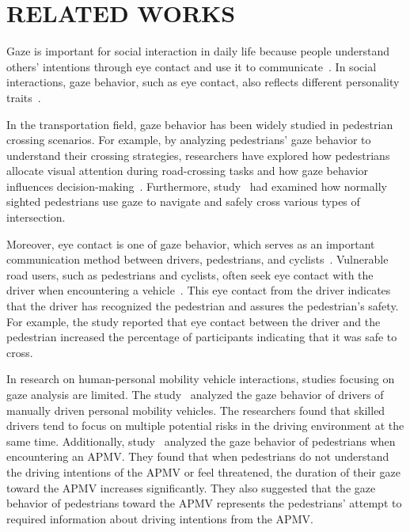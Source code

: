 \section{RELATED WORKS}
Gaze is important for social interaction in daily life because people understand others' intentions through eye contact and use it to communicate~\cite{rauthmann2012eyes}.
In social interactions, gaze behavior, such as eye contact, also reflects different personality traits~\cite{libby1973personality,brooks1986effects}.

In the transportation field, gaze behavior has been widely studied in pedestrian crossing scenarios. 
For example, by analyzing pedestrians' gaze behavior to understand their crossing strategies, researchers have explored how pedestrians allocate visual attention during road-crossing tasks and how gaze behavior influences decision-making~\cite{zhao2023pedestrian}.
Furthermore, study~\cite{geruschat2003gaze} had examined how normally sighted pedestrians use gaze to navigate and safely cross various types of intersection.


Moreover, eye contact is one of gaze behavior, which serves as an important communication method between drivers, pedestrians, and cyclists~\cite{rasouli2017agreeing,li2021autonomous}.
Vulnerable road users, such as pedestrians and cyclists, often seek eye contact with the driver when encountering a vehicle~\cite{sahai2022crossing, de2021pedestrians}.
This eye contact from the driver indicates that the driver has recognized the pedestrian and assures the pedestrian's safety.
For example, the study \cite{onkhar2022effect} reported that eye contact between the driver and the pedestrian increased the percentage of participants indicating that it was safe to cross.



In research on human-personal mobility vehicle interactions, studies focusing on gaze analysis are limited.
The study~\cite{maekawa2019analysis} analyzed the gaze behavior of drivers of manually driven personal mobility vehicles. 
The researchers found that skilled drivers tend to focus on multiple potential risks in the driving environment at the same time.
Additionally, study~\cite{liu2022implicit} analyzed the gaze behavior of pedestrians when encountering an APMV. 
They found that when pedestrians do not understand the driving intentions of the APMV or feel threatened, the duration of their gaze toward the APMV increases significantly. 
They also suggested that the gaze behavior of pedestrians toward the APMV represents the pedestrians' attempt to required information about driving intentions from the APMV.

